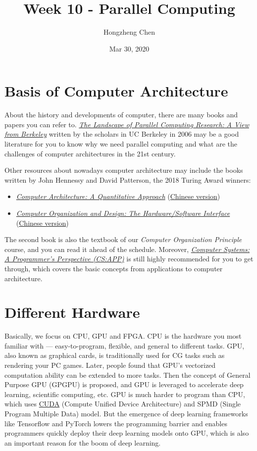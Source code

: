 \documentclass[english]{../TexTemplate/thesis}
\title{Week 10 - Parallel Computing}
\author{Hongzheng Chen}
\date{Mar 30, 2020}
\begin{document}
\maketitle

\section{Basis of Computer Architecture}
\label{sec:basis}
About the history and developments of computer, there are many books and papers you can refer to. \href{https://people.eecs.berkeley.edu/~krste/papers/BerkeleyView.pdf}{\emph{The Landscape of Parallel Computing Research: A View from
Berkeley}} written by the scholars in UC Berkeley in 2006 may be a good literature for you to know why we need parallel computing and what are the challenges of computer architectures in the 21st century.

Other resources about nowadays computer architecture may include the books written by John Hennessy and David Patterson, the 2018 Turing Award winners:
\begin{itemize}
	\item \href{http://uni-site.ir/khuelec/wp-content/uploads/Computer-Architecture-A-Quantitative-Approach.pdf}{\emph{Computer Architecture: A Quantitative Approach}} (\href{https://book.douban.com/subject/20452387/}{Chinese version})
	\item \href{http://ac.aua.am/arm/public/2017-Spring-Computer-Organization/Textbooks/ComputerOrganizationAndDesign5thEdition2014.pdf}{\emph{Computer Organization and Design: The Hardware/Software Interface}} (\href{https://book.douban.com/subject/26604008/}{Chinese version})
\end{itemize}
The second book is also the textbook of our \emph{Computer Organization Principle} course, and you can read it ahead of the schedule. Moreover, \href{https://csapp.cs.cmu.edu/}{\emph{Computer Systems: A Programmer's Perspective (CS:APP)}} is still highly recommended for you to get through, which covers the basic concepts from applications to computer architecture.

\section{Different Hardware}
Basically, we focus on CPU, GPU and FPGA.
CPU is the hardware you most familiar with --- easy-to-program, flexible, and general to different tasks.
GPU, also known as graphical cards, is traditionally used for CG tasks such as rendering your PC games. Later, people found that GPU's vectorized computation ability can be extended to more tasks. Then the concept of General Purpose GPU (GPGPU) is proposed, and GPU is leveraged to accelerate deep learning, scientific computing, etc.
GPU is much harder to program than CPU, which uses \href{https://developer.nvidia.com/cuda-zone}{CUDA} (Compute Unified Device Architecture) and SPMD (Single Program Multiple Data) model.
But the emergence of deep learning frameworks like Tensorflow and PyTorch lowers the programming barrier and enables programmers quickly deploy their deep learning models onto GPU, which is also an important reason for the boom of deep learning.
\end{document}
